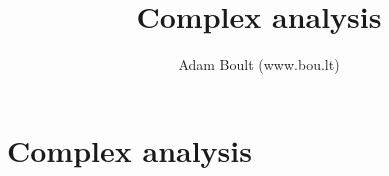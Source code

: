 \documentclass[oneside]{book}
\begin{document}
\author{Adam Boult (www.bou.lt)}
\title{Complex analysis}
\maketitle

\setcounter{tocdepth}{0}
\tableofcontents



\part{Complex analysis}




\end{document}
